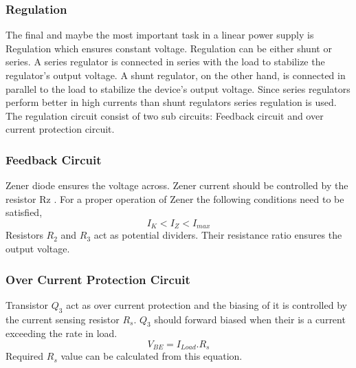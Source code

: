 \documentclass[11pt]{article}
\begin{document}
\begin{multicols}{2}
\subsubsection{Regulation}
The final and maybe the most important task in a linear power supply is Regulation which ensures constant voltage. Regulation can be either shunt or series. A series regulator is connected in series with the load to stabilize the regulator's output voltage. A shunt regulator, on the other hand, is connected in parallel to the load to stabilize the device's output voltage. Since series regulators perform better in high currents than shunt regulators series regulation is used.\\
The regulation circuit consist of two sub circuits: Feedback circuit and over current protection circuit.
\subsubsection{Feedback Circuit}
Zener diode ensures the voltage across. Zener current should be controlled by the resistor Rz . For a proper operation of Zener the following conditions need to be satisfied,
$$I_K<I_Z<I_{max}$$
Resistors $R_2$ and $R_3$ act as potential dividers. Their resistance ratio ensures the output voltage.
\subsubsection{Over Current Protection Circuit} Transistor $Q_3$ act as over current protection and the biasing of it is controlled by the current sensing resistor $R_s$. $Q_3$ should forward biased when their is a current exceeding the rate in load.
$$V_{BE} = I_{Load}.R_s$$
Required $R_s$ value can be calculated from this equation.

\end{multicols}
\end{document}
